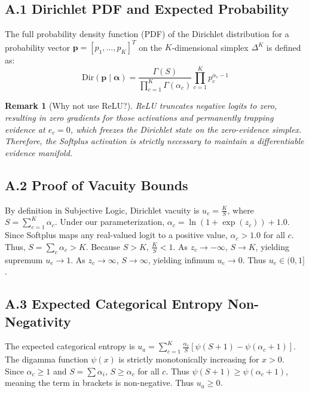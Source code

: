 \documentclass[letterpaper]{article} %
\newtheorem{remark}{Remark}
\begin{document}
\subsection{A.1 Dirichlet PDF and Expected Probability}
The full probability density function (PDF) of the Dirichlet distribution for a probability vector $\bm{p} = [p_1, \dots, p_K]^T$ on the $K$-dimensional simplex $\Delta^K$ is defined as:
\begin{equation}
    \text{Dir}(\bm{p} \mid \bm{\alpha}) = \frac{\Gamma(S)}{\prod_{c=1}^K \Gamma(\alpha_c)} \prod_{c=1}^K p_c^{\alpha_c - 1}
\end{equation}

\begin{remark}[Why not use ReLU?]
ReLU truncates negative logits to zero, resulting in zero gradients for those activations and permanently trapping evidence at $e_c = 0$, which freezes the Dirichlet state on the zero-evidence simplex. Therefore, the Softplus activation is strictly necessary to maintain a differentiable evidence manifold.
\end{remark}

\subsection{A.2 Proof of Vacuity Bounds}
By definition in Subjective Logic, Dirichlet vacuity is $u_e = \frac{K}{S}$, where $S = \sum_{c=1}^K \alpha_c$. Under our parameterization, $\alpha_c = \ln(1 + \exp(z_c)) + 1.0$. Since Softplus maps any real-valued logit to a positive value, $\alpha_c > 1.0$ for all $c$. Thus, $S = \sum_c \alpha_c > K$. Because $S > K$, $\frac{K}{S} < 1$. As $z_c \to -\infty$, $S \to K$, yielding supremum $u_e \to 1$. As $z_c \to \infty$, $S \to \infty$, yielding infimum $u_e \to 0$. Thus $u_e \in (0, 1]$.

\subsection{A.3 Expected Categorical Entropy Non-Negativity}
The expected categorical entropy is $u_a = \sum_{c=1}^K \frac{\alpha_c}{S} [\psi(S + 1) - \psi(\alpha_c + 1)]$. The digamma function $\psi(x)$ is strictly monotonically increasing for $x > 0$. Since $\alpha_c \ge 1$ and $S = \sum \alpha_i$, $S \ge \alpha_c$ for all $c$. Thus $\psi(S + 1) \ge \psi(\alpha_c + 1)$, meaning the term in brackets is non-negative. Thus $u_a \ge 0$.
\end{document}

